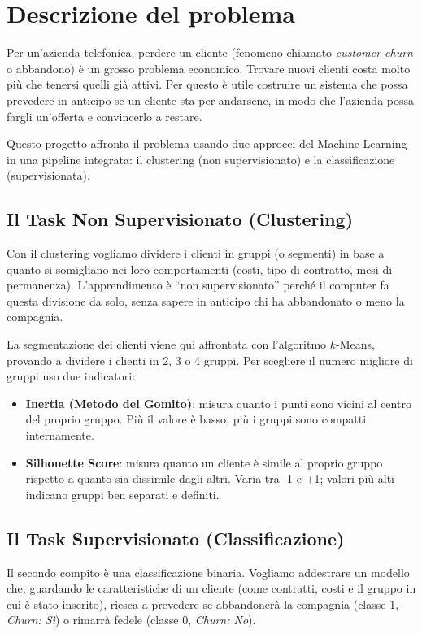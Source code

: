 \documentclass[a4paper,11pt]{article}
\begin{document}
\section{Descrizione del problema}
\label{sec:descrizione_problema}
Per un'azienda telefonica, perdere un cliente (fenomeno chiamato \textit{customer churn} o abbandono) è un grosso problema economico. Trovare nuovi clienti costa molto più che tenersi quelli già attivi. Per questo è utile costruire un sistema che possa prevedere in anticipo se un cliente sta per andarsene, in modo che l'azienda possa fargli un'offerta e convincerlo a restare.

Questo progetto affronta il problema usando due approcci del Machine Learning in una pipeline integrata: il clustering (non supervisionato) e la classificazione (supervisionata).

\subsection{Il Task Non Supervisionato (Clustering)}
Con il clustering vogliamo dividere i clienti in gruppi (o segmenti) in base a quanto si somigliano nei loro comportamenti (costi, tipo di contratto, mesi di permanenza). L'apprendimento è ``non supervisionato'' perché il computer fa questa divisione da solo, senza sapere in anticipo chi ha abbandonato o meno la compagnia.

La segmentazione dei clienti viene qui affrontata con l'algoritmo $k$-Means, provando a dividere i clienti in 2, 3 o 4 gruppi. Per scegliere il numero migliore di gruppi uso due indicatori:
\begin{itemize}
    \item \textbf{Inertia (Metodo del Gomito)}: misura quanto i punti sono vicini al centro del proprio gruppo. Più il valore è basso, più i gruppi sono compatti internamente.
    \item \textbf{Silhouette Score}: misura quanto un cliente è simile al proprio gruppo rispetto a quanto sia dissimile dagli altri. Varia tra -1 e +1; valori più alti indicano gruppi ben separati e definiti.
\end{itemize}

\subsection{Il Task Supervisionato (Classificazione)}
Il secondo compito è una classificazione binaria. Vogliamo addestrare un modello che, guardando le caratteristiche di un cliente (come contratti, costi e il gruppo in cui è stato inserito), riesca a prevedere se abbandonerà la compagnia (classe $1$, \textit{Churn: Sì}) o rimarrà fedele (classe $0$, \textit{Churn: No}).
\end{document}
